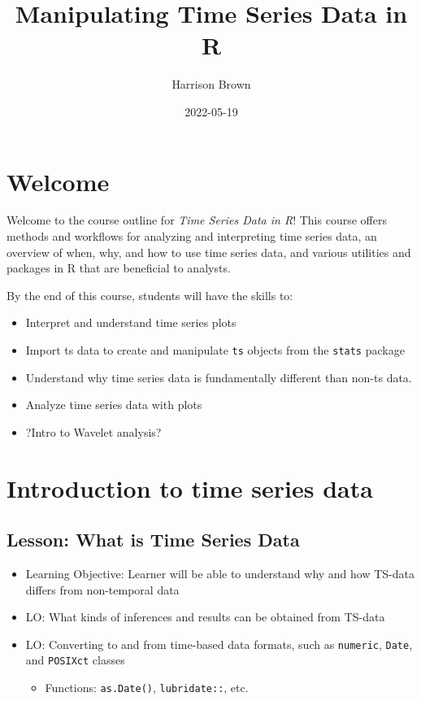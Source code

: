 \documentclass[
]{book}
\title{Manipulating Time Series Data in R}
\author{Harrison Brown}
\date{2022-05-19}
\providecommand{\tightlist}{%
  \setlength{\itemsep}{0pt}\setlength{\parskip}{0pt}}
\begin{document}
\maketitle

{
\setcounter{tocdepth}{1}
\tableofcontents
}
\hypertarget{welcome}{%
\chapter*{Welcome}\label{welcome}}

Welcome to the course outline for \emph{Time Series Data in R}! This course offers methods and workflows for analyzing and interpreting time series data, an overview of when, why, and how to use time series data, and various utilities and packages in R that are beneficial to analysts.

By the end of this course, students will have the skills to:

\begin{itemize}
\tightlist
\item
  Interpret and understand time series plots
\item
  Import ts data to create and manipulate \texttt{ts} objects from the \texttt{stats} package
\item
  Understand why time series data is fundamentally different than non-ts data.
\item
  Analyze time series data with plots
\item
  ?Intro to Wavelet analysis?
\end{itemize}

\hypertarget{introduction-to-time-series-data}{%
\chapter{Introduction to time series data}\label{introduction-to-time-series-data}}

\hypertarget{lesson-what-is-time-series-data}{%
\section{Lesson: What is Time Series Data}\label{lesson-what-is-time-series-data}}

\begin{itemize}
\tightlist
\item
  Learning Objective: Learner will be able to understand why and how TS-data differs from non-temporal data
\item
  LO: What kinds of inferences and results can be obtained from TS-data
\item
  LO: Converting to and from time-based data formats, such as \texttt{numeric}, \texttt{Date}, and \texttt{POSIXct} classes

  \begin{itemize}
  \tightlist
  \item
    Functions: \texttt{as.Date()}, \texttt{lubridate::}, etc.
  \end{itemize}
\end{itemize}
\end{document}
